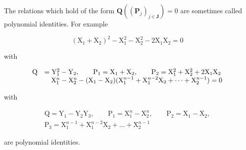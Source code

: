 The relations which hold of the form \(\mathbf{Q}((\mathbf{P}_{j})_{j\in\mathbf{J}})=0\) are sometimes called polynomial identities. For example

\[
\left(\mathrm{X} _ {1} + \mathrm{X} _ {2}\right) ^ {2} - \mathrm{X} _ {1} ^ {2} - \mathrm{X} _ {2} ^ {2} - 2 \mathrm{X} _ {1} \mathrm{X} _ {2} = 0
\]

with

\[
\begin{array}{r l} \mathrm{Q} & = \mathrm{Y} _ {1} ^ {2} - \mathrm{Y} _ {2}, \qquad \mathrm{P} _ {1} = \mathrm{X} _ {1} + \mathrm{X} _ {2}, \qquad \mathrm{P} _ {2} = \mathrm{X} _ {1} ^ {2} + \mathrm{X} _ {2} ^ {2} + 2 \mathrm{X} _ {1} \mathrm{X} _ {2} \\ & \quad \mathrm{X} _ {1} ^ {n} - \mathrm{X} _ {2} ^ {n} - (\mathrm{X} _ {1} - \mathrm{X} _ {2}) (\mathrm{X} _ {1} ^ {n - 1} + \mathrm{X} _ {1} ^ {n - 2} \mathrm{X} _ {2} + \dots + \mathrm{X} _ {2} ^ {n - 1}) = 0 \end{array}
\]

with

\[
\begin{array}{c} \mathrm{Q} = \mathrm{Y} _ {1} - \mathrm{Y} _ {2} \mathrm{Y} _ {3}, \qquad \mathrm{P} _ {1} = \mathrm{X} _ {1} ^ {n} - \mathrm{X} _ {2} ^ {n}, \qquad \mathrm{P} _ {2} = \mathrm{X} _ {1} - \mathrm{X} _ {2}, \\ \mathrm{P} _ {3} = \mathrm{X} _ {1} ^ {n - 1} + \mathrm{X} _ {1} ^ {n - 2} \mathrm{X} _ {2} + \dots + \mathrm{X} _ {2} ^ {n - 1} \end{array}
\]

are polynomial identities.

